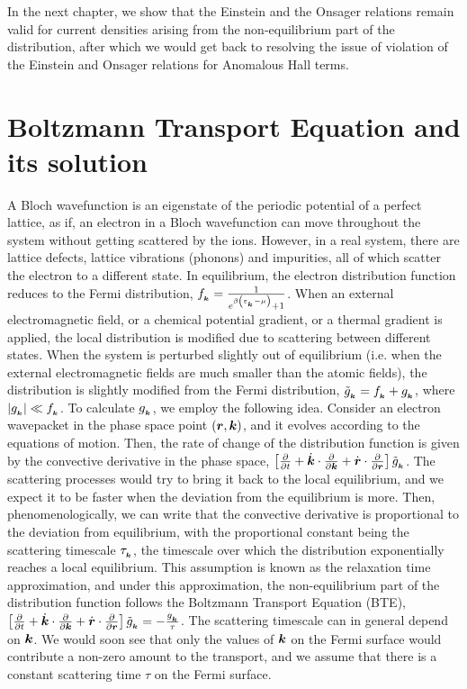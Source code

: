 \documentclass{report}
\renewcommand\vec[1]{\ensuremath\boldsymbol{#1}} %
\begin{document}
In the next chapter, we show that the Einstein and the Onsager relations remain valid for current densities arising from the non-equilibrium part of the distribution, after which we would get back to resolving the issue of violation of the Einstein and Onsager relations for Anomalous Hall terms.

\chapter{Boltzmann Transport Equation and its solution}\label{sec:BTE-and-solution}
A Bloch wavefunction is an eigenstate of the periodic potential of a perfect lattice, as if, an electron in a Bloch wavefunction can move throughout the system without getting scattered by the ions. However, in a real system, there are lattice defects, lattice vibrations (phonons) and impurities, all of which scatter the electron to a different state. In equilibrium, the electron distribution function reduces to the Fermi distribution, $f_{_{\vec{k}}} = \frac{1}{e^{\beta \left(\varepsilon_{_{\vec{k}}} - \mu \right)} + 1}$. When an external electromagnetic field, or a chemical potential gradient, or a thermal gradient is applied, the local distribution is modified due to scattering between different states. When the system is perturbed slightly out of equilibrium (i.e. when the external electromagnetic fields are much smaller than the atomic fields), the distribution is slightly modified from the Fermi distribution, $\tilde{g}_{_{\vec{k}}} = f_{_{\vec{k}}} + g_{_{\vec{k}}}$, where $|g_{_{\vec{k}}}| \ll f_{_{\vec{k}}}$. To calculate $g_{_{\vec{k}}}$, we employ the following idea. Consider an electron wavepacket in the phase space point $(\vec{r},\vec{k})$, and it evolves according to the equations of motion. Then, the rate of change of the distribution function is given by the convective derivative in the phase space, $\left[\frac{\partial}{\partial t} +  \dot{\vec{k}}\cdot\frac{\partial}{\partial \vec{k}} + \dot{\vec{r}}\cdot\frac{\partial}{\partial \vec{r}} \right]\tilde{g}_{_{\vec{k}}}$. The scattering processes would try to bring it back to the local equilibrium, and we expect it to be faster when the deviation from the equilibrium is more. Then, phenomenologically, we can write that the convective derivative is proportional to the deviation from equilibrium, with the proportional constant being the scattering timescale $\tau_{_{\vec{k}}}$, the timescale over which the distribution exponentially reaches a local equilibrium. This assumption is known as the relaxation time approximation, and under this approximation, the non-equilibrium part of the distribution function follows the Boltzmann Transport Equation (BTE), $\left[\frac{\partial}{\partial t} +  \dot{\vec{k}}\cdot\frac{\partial}{\partial \vec{k}} + \dot{\vec{r}}\cdot\frac{\partial}{\partial \vec{r}} \right]\tilde{g}_{_{\vec{k}}} = -\frac{g_{_{\vec{k}}}}{\tau}$. The scattering timescale can in general depend on $\vec{k}$. We would soon see that only the values of $\vec{k}$ on the Fermi surface would contribute a non-zero amount to the transport, and we assume that there is a constant scattering time $\tau$ on the Fermi surface. 
\end{document}
